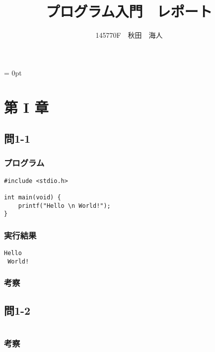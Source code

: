 \documentclass{jarticle}
\title{プログラム入門　レポート}
\author{145770F　秋田　海人}
\date{}
\begin{document}
\maketitle
\parindent = 0pt


\section{第 I 章\\}

\subsection{問1-1\\}
\subsubsection{プログラム\\}
\begin{breakbox}
\begin{verbatim}
#include <stdio.h>

int main(void) {
	printf("Hello \n World!");
}
\end{verbatim}
\end{breakbox}
\subsubsection{実行結果\\}
\begin{breakbox}
\begin{verbatim}
Hello 
 World!
\end{verbatim}
\end{breakbox}
\subsubsection{考察\\}

\subsection{問1-2\\}
\begin{breakbox}
\begin{verbatim}

\end{verbatim}
\end{breakbox}
\subsubsection{考察\\}
\end{document}

